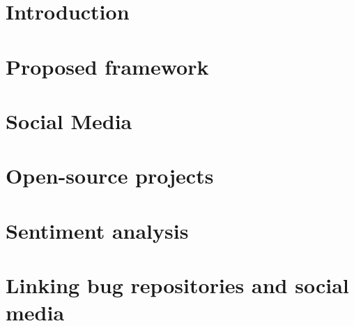 \documentclass[a4paper,11pt,pdftex,halfparskip,cleardoubleempty]{scrbook}
\begin{document}

\cleardoublepage
\tableofcontents 
\cleardoublepage
{}
\pagestyle{plain} 

\chapter{Introduction}
\label{chp:introduction}
 
 
\chapter{Proposed framework}
\label{chap:proposedFramework}




\chapter{Social Media}
\label{chap:socialMedia}



\chapter{Open-source projects}
\label{chap:ossProjects}



\chapter{Sentiment analysis}
\label{chap:sentimentAnalysis}


\chapter{Linking bug repositories and social media}
\label{chap:pairingBugs}




\label{sec:introduction}


\newpage
\nocite{*}


\end{document}
